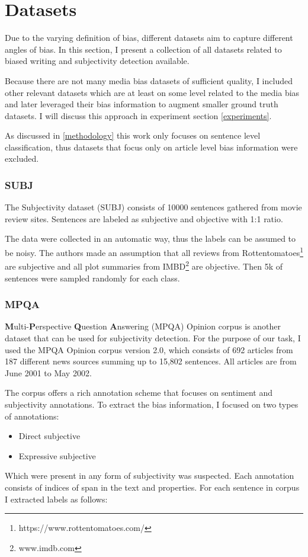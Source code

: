 \chapter{Datasets} \label{datasets}
Due to the varying definition of bias, different datasets aim to capture different angles of bias. In this section, I present a collection of all datasets related to biased writing and subjectivity detection available.

Because there are not many media bias datasets of sufficient quality, I included other relevant datasets which are at least on some level related to the media bias and later leveraged their bias information to augment smaller ground truth datasets. I will discuss this approach in experiment section \ref{experiments}.

As discussed in \ref{methodology} this work only focuses on sentence level classification, thus datasets that focus only on article level bias information were excluded.



\subsection[SUBJ]{SUBJ \cite{Pang+Lee:04a}}
The Subjectivity dataset (SUBJ) \cite{Pang+Lee:04a} consists of 10000 sentences gathered from movie review sites. Sentences are labeled as subjective and objective with 1:1 ratio. 

The data were collected in an automatic way, thus the labels can be assumed to be noisy. The authors made an assumption that all reviews from Rottentomatoes\footnote{https://www.rottentomatoes.com/} are subjective and all plot summaries from IMBD\footnote{ www.imdb.com} are objective. Then 5k of sentences were sampled randomly for each class.




\subsection{MPQA}
\textbf{M}ulti-\textbf{P}erspective \textbf{Q}uestion \textbf{A}nswering (MPQA) Opinion corpus is another dataset that can be used for subjectivity detection. For the purpose of our task, I used the MPQA Opinion corpus version 2.0, which consists of 692 articles from 187 different news sources summing up to 15,802 sentences. All articles are from June 2001 to May 2002.

The corpus offers a rich annotation scheme \cite{wiebe2005annotating} that focuses on sentiment and subjectivity annotations.
\newpage
To extract the bias information, I focused on two types of annotations:
\begin{itemize}
    \item Direct subjective
    \item Expressive subjective
\end{itemize}
Which were present in any form of subjectivity was suspected. Each annotation consists of indices of span in the text and properties. For each sentence in corpus I extracted labels as follows:


